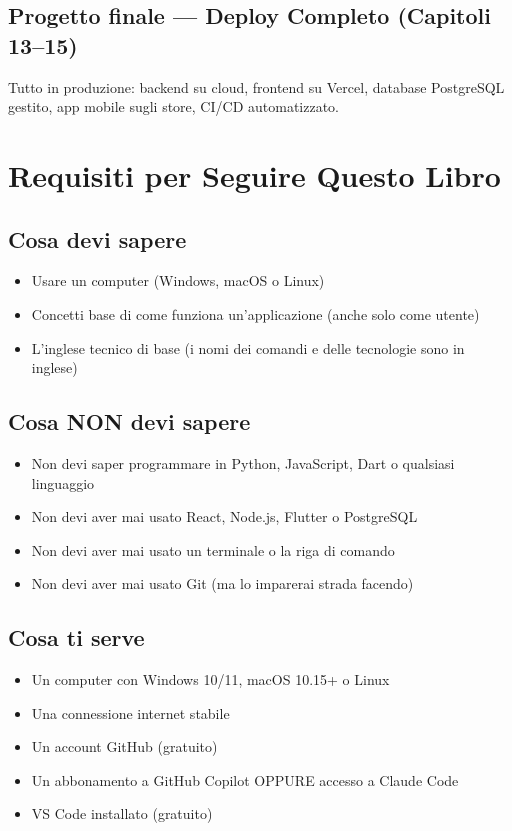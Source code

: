 \subsection*{Progetto finale --- Deploy Completo (Capitoli 13--15)}
Tutto in produzione: backend su cloud, frontend su Vercel, database PostgreSQL gestito, app mobile sugli store, CI/CD automatizzato.

\section{Requisiti per Seguire Questo Libro}

\subsection*{Cosa devi sapere}
\begin{itemize}
  \item Usare un computer (Windows, macOS o Linux)
  \item Concetti base di come funziona un'applicazione (anche solo come utente)
  \item L'inglese tecnico di base (i nomi dei comandi e delle tecnologie sono in inglese)
\end{itemize}

\subsection*{Cosa NON devi sapere}
\begin{itemize}
  \item Non devi saper programmare in Python, JavaScript, Dart o qualsiasi linguaggio
  \item Non devi aver mai usato React, Node.js, Flutter o PostgreSQL
  \item Non devi aver mai usato un terminale o la riga di comando
  \item Non devi aver mai usato Git (ma lo imparerai strada facendo)
\end{itemize}

\subsection*{Cosa ti serve}
\begin{itemize}
  \item Un computer con Windows 10/11, macOS 10.15+ o Linux
  \item Una connessione internet stabile
  \item Un account GitHub (gratuito)
  \item Un abbonamento a GitHub Copilot OPPURE accesso a Claude Code
  \item VS Code installato (gratuito)
\end{itemize}

